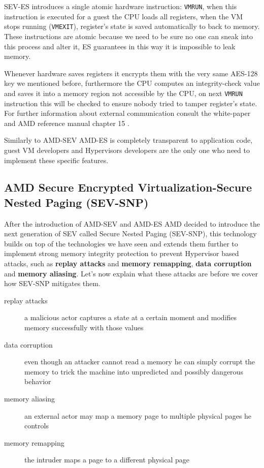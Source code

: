 \documentclass[twocolumn]{article}
\begin{document}
SEV-ES introduces a single atomic hardware instruction: \texttt{VMRUN}, when this instruction is executed for a guest the CPU loads all registers, when the VM stops running (\texttt{VMEXIT}), register's state is saved automatically to  back to memory. These instructions are atomic because we need to be sure no one can sneak into this process and alter it, ES guarantees in this way it is impossible to leak memory.

Whenever hardware saves registers it encrypts them with the very same AES-128 key we mentioned before, furthermore the CPU computes an integrity-check value and saves it into a memory region not accessible by the CPU, on next \texttt{VMRUN} instruction this will be checked to ensure nobody tried to tamper register's state. For further information about external communication consult the white-paper \cite{protecting-registers} and AMD reference manual chapter 15 \cite{architecture-reference}.

Similarly to AMD-SEV AMD-ES is completely transparent to application code, guest VM developers and Hypervisors developers are the only one who  need to implement these specific features.

\subsection{AMD Secure Encrypted Virtualization-Secure Nested Paging (SEV-SNP)}

After the introduction of AMD-SEV and AMD-ES AMD decided to introduce the next generation of SEV called Secure Nested Paging (SEV-SNP), this technology builds on top of the technologies we have seen and extends them further to implement strong memory integrity protection to prevent Hypervisor based attacks, such as \textbf{replay attacks} and \textbf{memory remapping}, \textbf{data corruption} and \textbf{memory aliasing}.
Let's now explain what these attacks are before we cover how SEV-SNP mitigates them.

\begin{description}
    \item[replay attacks] a malicious actor captures a state at a certain moment and modifies memory successfully with those values
    \item[data corruption] even though an attacker cannot read a memory he can simply corrupt the memory to trick the machine into unpredicted and possibly dangerous behavior
    \item[memory aliasing] an external actor may map a memory page to multiple physical pages he controls
    \item[memory remapping] the intruder maps a page to a different physical page
\end{description}
\end{document}
